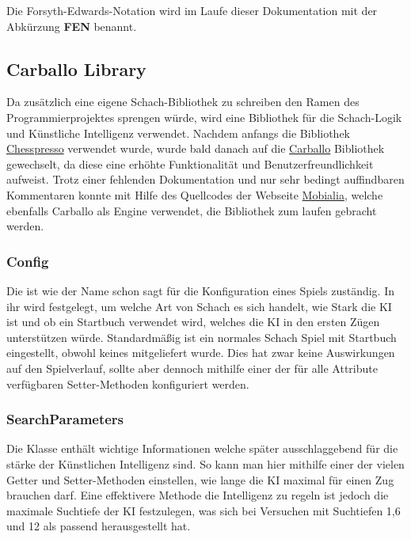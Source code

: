 Die Forsyth-Edwards-Notation wird im Laufe dieser Dokumentation mit der
Abkürzung \textbf{FEN} benannt.

\subsection{Carballo Library}
\subsectionauthor{\oliver}

Da zusätzlich eine eigene Schach-Bibliothek zu schreiben den Ramen des
Programmierprojektes sprengen würde, wird eine Bibliothek für die Schach-Logik
und Künstliche Intelligenz verwendet. Nachdem anfangs die Bibliothek
\href{http://www.chesspresso.org/}{Chesspresso} verwendet wurde, wurde bald
danach auf die \href{https://github.com/albertoruibal/carballo}{Carballo}
Bibliothek gewechselt, da diese eine erhöhte Funktionalität und
Benutzerfreundlichkeit aufweist. Trotz einer fehlenden Dokumentation und nur
sehr bedingt auffindbaren Kommentaren konnte mit Hilfe des Quellcodes der
Webseite \href{https://www.mobialia.com/webchessgwt/}{Mobialia}, welche
ebenfalls Carballo als Engine verwendet, die Bibliothek zum laufen gebracht
werden.

\subsubsection{Config}

Die  ist wie der Name schon sagt für die Konfiguration eines Spiels 
zuständig. In ihr wird festgelegt, um welche Art von Schach es sich handelt, wie 
Stark die KI ist und ob ein Startbuch verwendet wird, welches die KI in den 
ersten Zügen unterstützen würde. Standardmäßig ist  ein normales Schach Spiel 
mit Startbuch eingestellt, obwohl keines mitgeliefert wurde. Dies hat zwar keine 
Auswirkungen auf den Spielverlauf, sollte aber dennoch mithilfe einer der für 
alle Attribute verfügbaren Setter-Methoden konfiguriert werden.

\subsubsection{SearchParameters}

Die Klasse  enthält wichtige Informationen welche später 
ausschlaggebend für die stärke der Künstlichen Intelligenz sind. So kann man 
hier mithilfe einer der vielen Getter und Setter-Methoden einstellen, wie lange 
die KI maximal für einen Zug brauchen darf. Eine effektivere Methode die 
Intelligenz zu regeln ist jedoch die maximale Suchtiefe der KI festzulegen, was 
sich bei Versuchen mit Suchtiefen 1,6 und 12 als passend herausgestellt hat.

